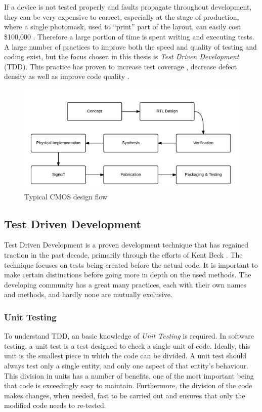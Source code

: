 \documentclass[11pt,british]{article}
\begin{document}
\\
\\
If a device is not tested properly and faults propagate throughout development, they can be very expensive to correct, especially at the stage of production, where a single photomask, used to ``print'' part of the layout, can easily cost \$100,000 \cite{key-3}. Therefore a large portion of time is spent writing and executing tests\cite{key-4}. A large number of practices to improve both the speed and quality of testing and coding exist, but the focus chosen in this thesis is \emph{Test Driven Development} (TDD). This practice has proven to increase test coverage \cite{key-5}, decrease defect density \cite{key-8} as well as improve code quality \cite{key-8,key-9}.

\begin{figure}[h]
    \centering
	\includegraphics[width=\textwidth]{images/Design_Flow.png}
    \caption{Typical CMOS design flow}
    \label{fig:Design_Flow}
\end{figure}


\subsection{Test Driven Development}
Test Driven Development is a proven development technique that has regained traction in the past decade, primarily through the efforts of Kent Beck \cite{key-10}. The technique focuses on tests being created before the actual code. It is important to make certain distinctions before going more in depth on the used methods. The developing community has a great many practices, each with their own names and methods, and hardly none are mutually exclusive.

\subsubsection{Unit Testing}
To understand TDD, an basic knowledge of \emph{Unit Testing} is required. In software testing, a unit test is a test designed to check a single unit of code. Ideally, this unit is the smallest piece in which the code can be divided. A unit test should always test only a single entity, and only one aspect of that entity's behaviour. This division in units has a number of benefits, one of the most important being that code is exceedingly easy to maintain. Furthermore, the division of the code makes changes, when needed, fast to be carried out and ensures that only the modified code needs to re-tested.
\end{document}

